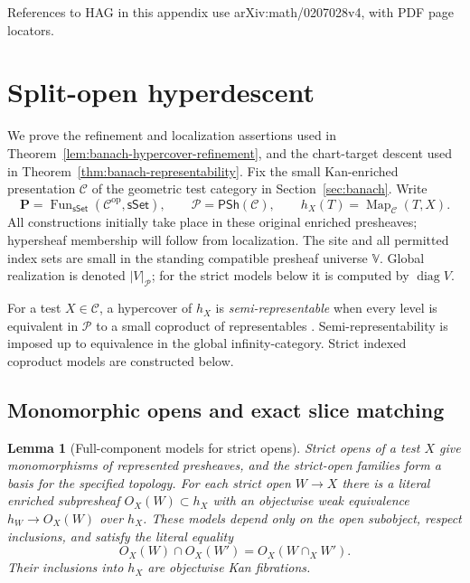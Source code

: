 \documentclass[12pt]{amsart}
\newtheorem{lem}[thm]{Lemma}
\theoremstyle{definition}
\theoremstyle{remark}
\numberwithin{equation}{section}
\newcommand{\PSh}{\mathsf{PSh}}
\newcommand{\sSet}{\mathsf{sSet}}
\newcommand{\op}{\mathrm{op}}
\DeclareMathOperator{\Map}{Map}
\DeclareMathOperator{\Fun}{Fun}
\begin{document}
References to HAG in this appendix use
arXiv:math/0207028v4, with PDF page locators.

\section{Split-open hyperdescent}
\label{app:split-open-hyperdescent}

We prove the refinement and localization assertions used in
Theorem~\ref{lem:banach-hypercover-refinement}, and the
chart-target descent used in
Theorem~\ref{thm:banach-representability}.
Fix the small Kan-enriched presentation $\mathcal C$
of the geometric test category in Section~\ref{sec:banach}.
Write
\[
 \mathbf P=\Fun_{\sSet}(\mathcal C^\op,\sSet),
 \qquad \mathcal P=\PSh(\mathcal C),\qquad
 h_X(T)=\Map_{\mathcal C}(T,X).
\]
All constructions initially take place in these original
enriched presheaves; hypersheaf membership will follow
from localization.
The site and all permitted index sets are small in the
standing compatible presheaf universe $\mathbb V$.
Global realization is denoted $|V|_{\mathcal P}$;
for the strict models below it is computed by
$\operatorname{diag}V$.

For a test $X\in\mathcal C$, a hypercover of $h_X$ is
\emph{semi-representable} when every level is equivalent
in $\mathcal P$ to a small coproduct of representables
\cite[Definition~3.4.8(1), PDF leaf~33]{HAGI2005}.
Semi-representability is imposed up to equivalence
in the global infinity-category. Strict indexed
coproduct models are constructed below.

\subsection{Monomorphic opens and exact slice matching}

\begin{lem}[Full-component models for strict opens]
Strict opens of a test $X$ give monomorphisms of
represented presheaves, and the strict-open families
form a basis for the specified topology.
\label{lem:banach-open-monomorphic-models}
For each strict open $W\to X$ there is a literal enriched
subpresheaf $O_X(W)\subset h_X$ with an objectwise weak
equivalence $h_W\to O_X(W)$ over $h_X$.
These models depend only on the open subobject,
respect inclusions, and satisfy the literal equality
\[
 O_X(W)\cap O_X(W')=O_X(W\cap_X W').
\]
Their inclusions into $h_X$ are objectwise Kan fibrations.
\end{lem}
\end{document}
